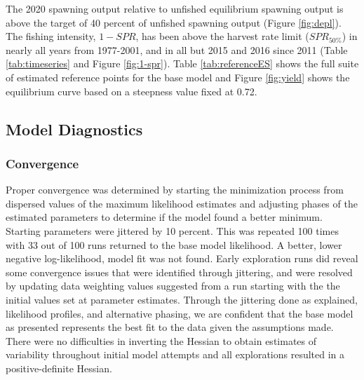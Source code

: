 \documentclass[11pt,
  english,
  a4paper,
]{article}
\begin{document}
\leavevmode\tagmcend\tagstructend\par


The 2020 spawning output relative to unfished equilibrium spawning output is above the target of 40 percent of unfished spawning output (Figure \ref{fig:depl}). The fishing intensity, {\(1-SPR\)\leavevmode\tagmcend\tagstructend}, has been above the harvest rate limit ({\(SPR_{50\%}\)\leavevmode\tagmcend\tagstructend}) in nearly all years from 1977-2001, and in all but 2015 and 2016 since 2011 (Table \ref{tab:timeseries} and Figure \ref{fig:1-spr}). Table \ref{tab:referenceES} shows the full suite of estimated reference points for the base model and Figure \ref{fig:yield} shows the equilibrium curve based on a steepness value fixed at 0.72.

\leavevmode\tagmcend\tagstructend\par


\hypertarget{model-diagnostics}{%
\subsection{Model Diagnostics}\label{model-diagnostics}}

\leavevmode\tagmcend\tagstructend


\hypertarget{convergence}{%
\subsubsection{Convergence}\label{convergence}}

\leavevmode\tagmcend\tagstructend


Proper convergence was determined by starting the minimization process from dispersed values of the maximum likelihood estimates and adjusting phases of the estimated parameters to determine if the model found a better minimum. Starting parameters were jittered by 10 percent. This was repeated 100 times with 33 out of 100 runs returned to the base model likelihood. A better, lower negative log-likelihood, model fit was not found. Early exploration runs did reveal some convergence issues that were identified through jittering, and were resolved by updating data weighting values suggested from a run starting with the the initial values set at parameter estimates. Through the jittering done as explained, likelihood profiles, and alternative phasing, we are confident that the base model as presented represents the best fit to the data given the assumptions made. There were no difficulties in inverting the Hessian to obtain estimates of variability throughout initial model attempts and all explorations resulted in a positive-definite Hessian.
\end{document}
